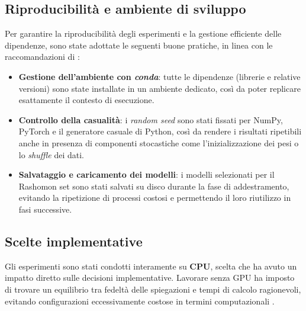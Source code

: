 \documentclass{article}
\begin{document}
\subsection{Riproducibilità e ambiente di sviluppo}
Per garantire la riproducibilità degli esperimenti e la gestione efficiente
delle dipendenze, sono state adottate le seguenti buone pratiche, in linea con
le raccomandazioni di \citet{pineau2020improving}:

\begin{itemize}
      \item \textbf{Gestione dell’ambiente con \emph{conda}}: tutte le dipendenze (librerie e relative versioni) sono state installate in un ambiente dedicato, così da poter replicare esattamente il contesto di esecuzione.
      \item \textbf{Controllo della casualità}: i \emph{random seed} sono stati fissati per NumPy, PyTorch e il generatore casuale di Python, così da rendere i risultati ripetibili anche in presenza di componenti stocastiche come l’inizializzazione dei pesi o lo \emph{shuffle} dei dati.
      \item \textbf{Salvataggio e caricamento dei modelli}: i modelli selezionati per il Rashomon set sono stati salvati su disco durante la fase di addestramento, evitando la ripetizione di processi costosi e permettendo il loro riutilizzo in fasi successive.
\end{itemize}

\subsection{Scelte implementative}

Gli esperimenti sono stati condotti interamente su \textbf{CPU}, scelta che ha
avuto un impatto diretto sulle decisioni implementative. Lavorare senza GPU ha
imposto di trovare un equilibrio tra fedeltà delle spiegazioni e tempi di
calcolo ragionevoli, evitando configurazioni eccessivamente costose in termini
computazionali \citep{leventi2023consistency}.
\end{document}
